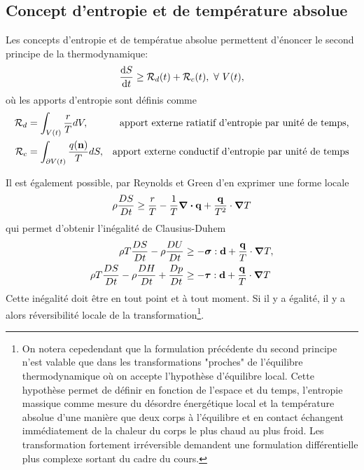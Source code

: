 \documentclass[a4paper,11pt]{report}
\newcommand{\dvm}[2]{\frac{D #1}{D #2}}
\newcommand{\bs}[1]{\boldsymbol{#1}}
\begin{document}
      \subsection{Concept d'entropie et de température absolue}
        Les concepts d'entropie et de températue absolue permettent d'énoncer le second principe de la thermodynamique:
        \begin{equation}
          \dv{S}{t} \geq \mathcal{R}_d(t) + \mathcal{R}_c(t),~\forall~V(t),
        \end{equation}
       où les apports d'entropie sont définis comme
       \begin{align*}
         \mathcal{R}_d &= \int_{V(t)} \frac{r}{T} dV, & \textrm{apport externe ratiatif d'entropie par unité de temps,}\\
         \mathcal{R}_c &= \int_{\partial V(t)} \frac{q(\vb{n})}{T}dS, & \textrm{apport externe conductif d'entropie par unité de temps}
       \end{align*}

       Il est également possible, par Reynolds et Green d'en exprimer une forme locale
       \begin{equation}
         \rho \dvm{S}{t} \geq \frac{r}{T} - \frac{1}{T}\div \vb{q} + \frac{\vb{q}}{T^2} \cdot \grad T
       \end{equation}
       qui permet d'obtenir l'inégalité de Clausius-Duhem
       \begin{gather}
         \begin{aligned}
           \rho T \dvm{S}{t} - \rho \dvm{U}{t} &\geq - \bs{\sigma} : \vb{d} + \frac{\vb{q}}{T} \cdot \grad T,\\
           \rho T \dvm{S}{t} - \rho \dvm{H}{t} + \dvm{p}{t} &\geq - \bs{\tau} : \vb{d} + \frac{\vb{q}}{T} \cdot \grad T
         \end{aligned}
       \end{gather}
       Cette inégalité doit être en tout point et à tout moment. Si il y a égalité, il y a alors réversibilité locale de la transformation\footnote{On notera cepedendant que la formulation précédente du second principe n'est valable que dans les transformations "proches" de l'équilibre thermodynamique où on accepte l'hypothèse d'équilibre local. Cette hypothèse permet de définir en fonction de l'espace et du temps, l'entropie massique comme mesure du désordre énergétique local et la température absolue d'une manière que deux corps à l'équilibre et en contact échangent immédiatement de la chaleur du corps le plus chaud au plus froid. Les transformation fortement irréversible demandent une formulation différentielle plus complexe sortant du cadre du cours.}.



\begin{appendix}
  
\end{appendix}
\end{document}
